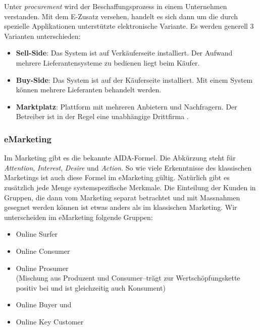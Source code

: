Unter \emph{procurement} wird der Beschaffungsprozess in einem Unternehmen
verstanden. Mit dem E-Zusatz versehen, handelt es sich dann um die durch
spezielle Applikationen unterstützte elektronische Variante. Es
werden generell 3 Varianten unterschieden:

\begin{itemize}
    \item\textbf{Sell-Side}: Das System ist auf Verkäuferseite installiert.
    Der Aufwand mehrere Lieferantensysteme zu bedienen liegt beim Käufer.
    \item\textbf{Buy-Side}: Das System ist auf der Käuferseite installiert.
    Mit einem System können mehrere Lieferanten behandelt werden.
    \item\textbf{Marktplatz}: Plattform mit mehreren Anbietern und Nachfragern.
    Der Betreiber ist in der Regel eine unabhängige Drittfirma .
\end{itemize}

\subsubsection*{eMarketing}

Im Marketing gibt es die bekannte AIDA-Formel. Die Abkürzung steht für
\emph{Attention}, \emph{Interest}, \emph{Desire} und \emph{Action}.
So wie viele Erkenntnisse des klassischen Marketings ist auch diese
Formel im eMarketing gültig. Natürlich gibt es zusätzlich jede Menge
systemspezifische Merkmale. Die Einteilung der Kunden in Gruppen,
die dann vom Marketing separat betrachtet und mit Massnahmen gesegnet
werden können ist etwas anders als im klassischen Marketing. Wir
unterscheiden im eMarketing folgende Gruppen:

\begin{itemize}
    \item Online Surfer
    \item Online Consumer
    \item Online Prosumer \\
    (Mischung aus Produzent und Consumer--trägt zur Wertschöpfungskette
    positiv bei und ist gleichzeitig auch Konsument)
    \item Online Buyer und
    \item Online Key Customer
\end{itemize}



